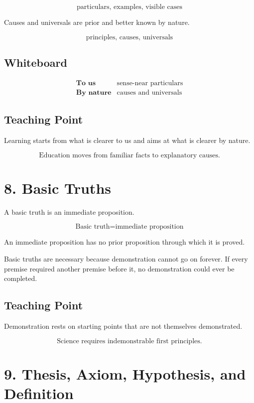 \documentclass[12pt]{article}
\begin{document}
\[
\text{particulars, examples, visible cases}
\]

Causes and universals are prior and better known by nature.

\[
\text{principles, causes, universals}
\]

\subsection*{Whiteboard}

\[
\begin{array}{ll}
\textbf{To us} & \text{sense-near particulars} \\
\textbf{By nature} & \text{causes and universals}
\end{array}
\]

\subsection*{Teaching Point}

Learning starts from what is clearer to us and aims at what is clearer by
nature.

\[
\boxed{
\text{Education moves from familiar facts to explanatory causes.}
}
\]

\section*{8. Basic Truths}

A basic truth is an immediate proposition.

\[
\boxed{
\text{Basic truth} = \text{immediate proposition}
}
\]

An immediate proposition has no prior proposition through which it is proved.

Basic truths are necessary because demonstration cannot go on forever. If every
premise required another premise before it, no demonstration could ever be
completed.

\subsection*{Teaching Point}

Demonstration rests on starting points that are not themselves demonstrated.

\[
\boxed{
\text{Science requires indemonstrable first principles.}
}
\]

\section*{9. Thesis, Axiom, Hypothesis, and Definition}
\end{document}

